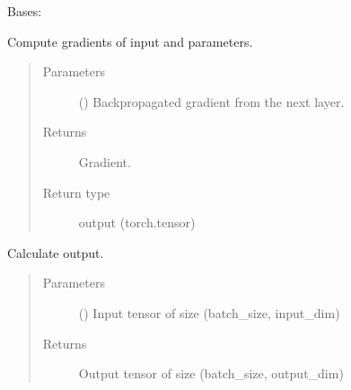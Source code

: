 \documentclass[letterpaper,10pt,english,openany,oneside]{sphinxmanual}
\begin{document}
\begin{fulllineitems}
\label{\detokenize{nn:nn.linear.Linear}}
Bases: {\hyperref[\detokenize{nn:nn.linear.Layer}]{}}

\begin{fulllineitems}
\label{\detokenize{nn:nn.linear.Linear.backward}}
Compute gradients of input and parameters.
\begin{quote}\begin{description}
\item[{Parameters}] \leavevmode
{} () \textendash{} Backpropagated gradient from the next layer.

\item[{Returns}] \leavevmode
Gradient.

\item[{Return type}] \leavevmode
output (torch.tensor)

\end{description}\end{quote}

\end{fulllineitems}


\begin{fulllineitems}
\label{\detokenize{nn:nn.linear.Linear.forward}}
Calculate output.
\begin{quote}\begin{description}
\item[{Parameters}] \leavevmode
{} () \textendash{} Input tensor of size (batch\_size, input\_dim)

\item[{Returns}] \leavevmode
Output tensor of size (batch\_size, output\_dim)


\end{description}
\end{quote}
\end{fulllineitems}
\end{fulllineitems}
\end{document}
